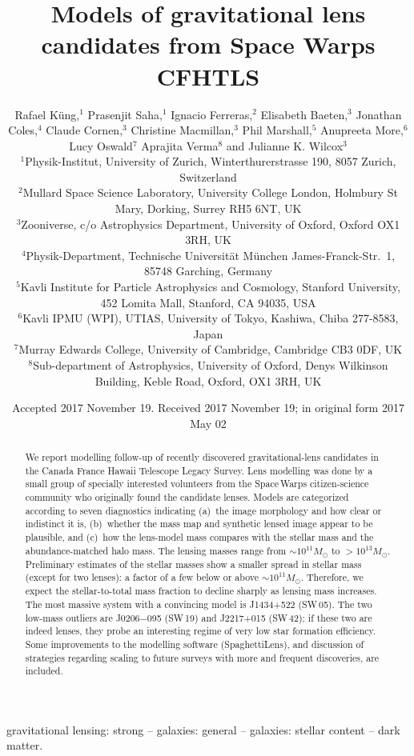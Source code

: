 \documentclass[fleqn,usenatbib]{template/mnras}
\title[Lens models for Space Warps CFHTLS]{Models of gravitational
    lens candidates from Space Warps CFHTLS}
\author[K\"ung et al]{Rafael K\"ung,$^{1}$
Prasenjit Saha,$^{1}$
Ignacio Ferreras,$^{2}$
Elisabeth Baeten,$^{3}$
\newauthor
Jonathan Coles,$^{4}$
Claude Cornen,$^{3}$
Christine Macmillan,$^{3}$
Phil Marshall,$^{5}$ 
\newauthor
Anupreeta More,$^{6}$
Lucy Oswald$^{7}$
Aprajita Verma$^{8}$
and Julianne K. Wilcox$^{3}$
%
\\
%
$^{1}$Physik-Institut, University of Zurich, Winterthurerstrasse 190, 8057 Zurich, Switzerland\\
$^{2}$Mullard Space Science Laboratory, University College London, Holmbury St Mary, Dorking, Surrey RH5 6NT, UK\\
$^{3}$Zooniverse, c/o Astrophysics Department, University of Oxford, Oxford OX1 3RH, UK \\
$^{4}$Physik-Department, Technische Universit\"at M\"unchen
James-Franck-Str.~1, 85748 Garching, Germany\\
$^{5}$Kavli Institute for Particle Astrophysics and Cosmology, Stanford University, 452 Lomita Mall, Stanford, CA 94035, USA\\
$^{6}$Kavli IPMU (WPI), UTIAS, University of Tokyo, Kashiwa, Chiba 277-8583, Japan\\
$^{7}$Murray Edwards College, University of Cambridge, Cambridge CB3 0DF, UK\\
$^{8}$Sub-department of Astrophysics, University of Oxford, Denys Wilkinson Building, Keble Road, Oxford, OX1 3RH, UK\\
}
\date{Accepted 2017 November 19. Received 2017 November 19; in original form 2017 May 02}
\newcommand{\SW}{Space\,Warps\xspace}
\newcommand{\sw}[1]{SW\,#1\xspace}
\begin{document}
\label{firstpage}
\pagerange{\pageref{firstpage}--\pageref{lastpage}}
\maketitle

\begin{abstract}
We report modelling follow-up of recently discovered
gravitational-lens candidates in the Canada France Hawaii Telescope
Legacy Survey. Lens modelling was done by a small group of
specially interested volunteers from the \SW citizen-science community
who originally found the candidate lenses.  Models are categorized
according to seven diagnostics indicating (a)~the image morphology and
how clear or indistinct it is, (b)~whether the mass map and synthetic
lensed image appear to be plausible, and (c)~how the lens-model mass
compares with the stellar mass and the abundance-matched halo mass.
The lensing masses range from $\sim10^{11}M_\odot$ to
$>10^{13}M_\odot$. Preliminary estimates of the stellar masses show a
smaller spread in stellar mass (except for two lenses): a factor of a
few below or above $\sim10^{11}M_\odot$.  Therefore, we expect the
stellar-to-total mass fraction to decline sharply as lensing mass
increases.  The most massive system with a convincing model is
J1434+522 (\sw{05}).  The two low-mass outliers are J0206$-$095
(\sw{19}) and J2217+015 (\sw{42}); if these two are indeed lenses,
they probe an interesting regime of very low star formation
efficiency.  Some improvements to the modelling software
(SpaghettiLens), and discussion of strategies regarding scaling to
future surveys with more and frequent discoveries, are included.
\end{abstract}

\begin{keywords}
gravitational lensing: strong -- galaxies: general
-- galaxies: stellar content -- dark matter.
\end{keywords}















\clearpage



\clearpage

\appendix




\bsp	%
\label{lastpage}
\end{document}
